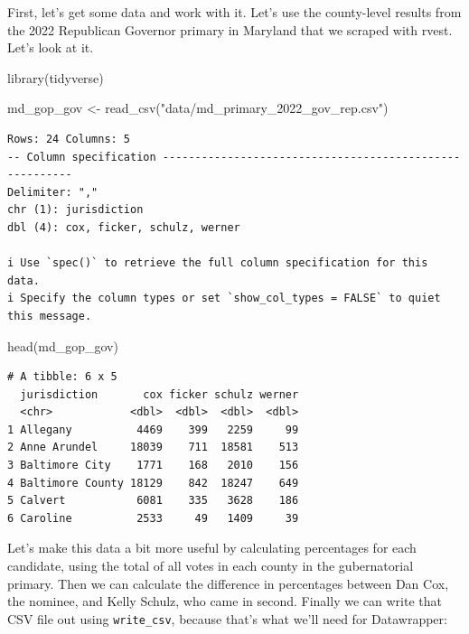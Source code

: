 \documentclass[
  letterpaper,
  DIV=11,
  numbers=noendperiod]{scrreprt}
\newenvironment{Shaded}{\begin{snugshade}}{\end{snugshade}}
\newcommand{\FunctionTok}[1]{\textcolor[rgb]{0.28,0.35,0.67}{#1}}
\newcommand{\NormalTok}[1]{\textcolor[rgb]{0.00,0.23,0.31}{#1}}
\newcommand{\OtherTok}[1]{\textcolor[rgb]{0.00,0.23,0.31}{#1}}
\newcommand{\StringTok}[1]{\textcolor[rgb]{0.13,0.47,0.30}{#1}}
\begin{document}
First, let's get some data and work with it. Let's use the county-level
results from the 2022 Republican Governor primary in Maryland that we
scraped with rvest. Let's look at it.

\begin{Shaded}
\begin{Highlighting}[]
\FunctionTok{library}\NormalTok{(tidyverse)}
\end{Highlighting}
\end{Shaded}

\begin{Shaded}
\begin{Highlighting}[]
\NormalTok{md\_gop\_gov }\OtherTok{\textless{}{-}} \FunctionTok{read\_csv}\NormalTok{(}\StringTok{"data/md\_primary\_2022\_gov\_rep.csv"}\NormalTok{)}
\end{Highlighting}
\end{Shaded}

\begin{verbatim}
Rows: 24 Columns: 5
-- Column specification --------------------------------------------------------
Delimiter: ","
chr (1): jurisdiction
dbl (4): cox, ficker, schulz, werner

i Use `spec()` to retrieve the full column specification for this data.
i Specify the column types or set `show_col_types = FALSE` to quiet this message.
\end{verbatim}

\begin{Shaded}
\begin{Highlighting}[]
\FunctionTok{head}\NormalTok{(md\_gop\_gov)}
\end{Highlighting}
\end{Shaded}

\begin{verbatim}
# A tibble: 6 x 5
  jurisdiction       cox ficker schulz werner
  <chr>            <dbl>  <dbl>  <dbl>  <dbl>
1 Allegany          4469    399   2259     99
2 Anne Arundel     18039    711  18581    513
3 Baltimore City    1771    168   2010    156
4 Baltimore County 18129    842  18247    649
5 Calvert           6081    335   3628    186
6 Caroline          2533     49   1409     39
\end{verbatim}

Let's make this data a bit more useful by calculating percentages for
each candidate, using the total of all votes in each county in the
gubernatorial primary. Then we can calculate the difference in
percentages between Dan Cox, the nominee, and Kelly Schulz, who came in
second. Finally we can write that CSV file out using
\texttt{write\_csv}, because that's what we'll need for Datawrapper:
\end{document}
